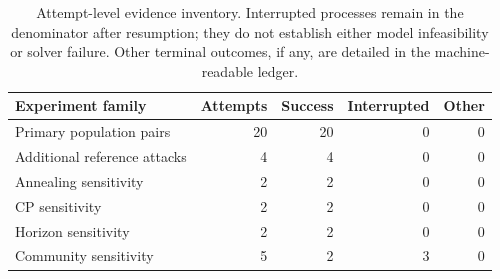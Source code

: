 \begin{table}[tb]\centering\small
\caption{Attempt-level evidence inventory. Interrupted processes remain in the denominator after resumption; they do not establish either model infeasibility or solver failure. Other terminal outcomes, if any, are detailed in the machine-readable ledger.}\label{tab:ledger}
\begin{tabular}{@{}lrrrr@{}}\toprule
Experiment family & Attempts & Success & Interrupted & Other \\ \midrule
Primary population pairs & 20 & 20 & 0 & 0 \\
Additional reference attacks & 4 & 4 & 0 & 0 \\
Annealing sensitivity & 2 & 2 & 0 & 0 \\
CP sensitivity & 2 & 2 & 0 & 0 \\
Horizon sensitivity & 2 & 2 & 0 & 0 \\
Community sensitivity & 5 & 2 & 3 & 0 \\
\bottomrule\end{tabular}\end{table}
